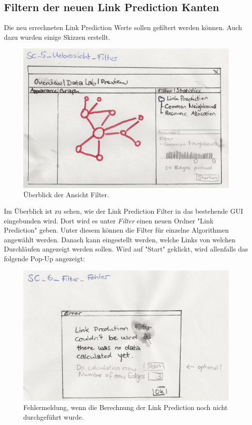 \subsection{Filtern der neuen Link Prediction Kanten}

Die neu errechneten Link Prediction Werte sollen gefiltert werden können. Auch dazu wurden einige Skizzen erstellt.

\begin{figure}[htbp]
    \includegraphics[width=\linewidth]{resources/SC-5.png}
    \caption{Überblick der Ansicht Filter.}
    \label{fig:screen5}
\end{figure}

Im Überblick ist zu sehen, wie der Link Prediction Filter in das bestehende GUI eingebunden wird. Dort wird es unter
\textit{Filter} einen neuen Ordner "Link Prediction" geben. Unter diesem können die Filter für einzelne Algorithmen
angewählt werden. Danach kann eingestellt werden, welche Links von welchen Durchläufen angezeigt werden sollen. Wird auf
"Start" geklickt, wird allenfalls das folgende Pop-Up angezeigt:

\begin{figure}[htbp]
    \includegraphics[width=\linewidth]{resources/SC-6.png}
    \caption{Fehlermeldung, wenn die Berechnung der Link Prediction noch nicht durchgeführt wurde.}
    \label{fig:screen6}
\end{figure}

